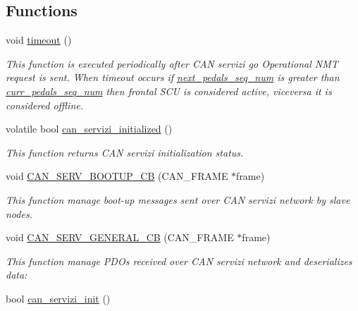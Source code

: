\subsection*{Functions}
\begin{DoxyCompactItemize}
\item 
void \mbox{\hyperlink{group___c_a_n__servizi__group_gad446b5782bcb2d8ffc0aa1f8c4d16ded}{timeout}} ()
\begin{DoxyCompactList}\small\item\em This function is executed periodically after C\+AN servizi \textquotesingle{}go Operational\textquotesingle{} N\+MT request is sent. When timeout occurs if \mbox{\hyperlink{group___c_a_n__servizi__group_gadcbd4ad67b50cf61731266bf5c5ba158}{next\+\_\+pedals\+\_\+seq\+\_\+num}} is greater than \mbox{\hyperlink{group___c_a_n__servizi__group_gacad002b7cb06bffa8811859e6f53cb28}{curr\+\_\+pedals\+\_\+seq\+\_\+num}} then frontal S\+CU is considered active, viceversa it is considered offline. \end{DoxyCompactList}\item 
volatile bool \mbox{\hyperlink{group___c_a_n__servizi__group_gaa460928ec03256a076ebafceab10c2be}{can\+\_\+servizi\+\_\+initialized}} ()
\begin{DoxyCompactList}\small\item\em This function returns C\+AN servizi initialization status. \end{DoxyCompactList}\item 
void \mbox{\hyperlink{group___c_a_n__servizi__group_gaab9a1dbabaf97e474f5597e8b2a02c6e}{C\+A\+N\+\_\+\+S\+E\+R\+V\+\_\+\+B\+O\+O\+T\+U\+P\+\_\+\+CB}} (C\+A\+N\+\_\+\+F\+R\+A\+ME $\ast$frame)
\begin{DoxyCompactList}\small\item\em This function manage boot-\/up messages sent over C\+AN servizi network by slave nodes. \end{DoxyCompactList}\item 
void \mbox{\hyperlink{group___c_a_n__servizi__group_ga5897a28288e24aa5131ff5b81f5fedc8}{C\+A\+N\+\_\+\+S\+E\+R\+V\+\_\+\+G\+E\+N\+E\+R\+A\+L\+\_\+\+CB}} (C\+A\+N\+\_\+\+F\+R\+A\+ME $\ast$frame)
\begin{DoxyCompactList}\small\item\em This function manage P\+D\+Os received over C\+AN servizi network and deserializes data\+: \end{DoxyCompactList}\item 
bool \mbox{\hyperlink{group___c_a_n__servizi__group_ga2d29bd107e96ae1986e8874f004ffc84}{can\+\_\+servizi\+\_\+init}} ()

\end{DoxyCompactItemize}
